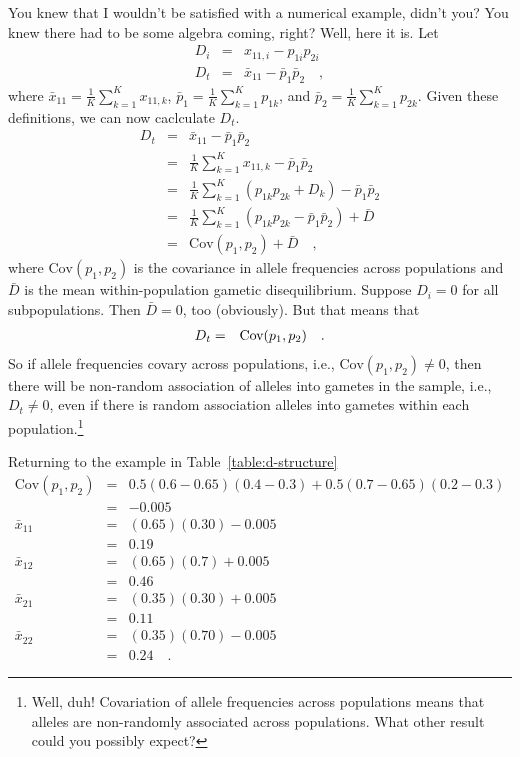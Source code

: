 \documentclass[12pt]{article}
\begin{document}
You knew that I wouldn't be satisfied with a numerical example, didn't
you? You knew there had to be some algebra coming, right? Well, here
it is. Let
\begin{eqnarray*}
D_i &=& x_{11,i} - p_{1i}p_{2i} \\
D_t &=& \bar x_{11} - \bar p_1\bar p_2 \quad ,
\end{eqnarray*}
where $\bar x_{11} = \frac{1}{K} \sum_{k=1}^K x_{11,k}$, $\bar p_1 =
\frac{1}{K} \sum_{k=1}^K p_{1k}$, and $\bar p_2 = \frac{1}{K}
\sum_{k=1}^K p_{2k}$. Given these definitions, we can now caclculate
$D_t$. 
\begin{eqnarray*}
D_t &=& \bar x_{11} - \bar p_1\bar p_2 \\
    &=& \frac{1}{K} \sum_{k=1}^K x_{11,k} - \bar p_1\bar p_2 \\
    &=& \frac{1}{K} \sum_{k=1}^K (p_{1k}p_{2k} + D_k) - \bar p_1\bar p_2 \\
    &=& \frac{1}{K} \sum_{k=1}^K (p_{1k}p_{2k} - \bar p_1\bar p_2) + \bar D \\
    &=& \mbox{Cov}(p_1, p_2) + \bar D \quad ,
\end{eqnarray*}
where $\mbox{Cov}(p_1, p_2)$ is the covariance in allele frequencies
across populations and $\bar D$ is the mean within-population gametic
disequilibrium. Suppose $D_i = 0$ for all subpopulations. Then $\bar D
= 0$, too (obviously). But that means that
\begin{eqnarray*}
D_t &=& \hbox{Cov}(p_1, p_2) \quad .
\end{eqnarray*}
So if allele frequencies covary across populations, i.e.,
$\mbox{Cov}(p_1, p_2) \ne 0$, then there will be non-random
association of alleles into gametes in the sample, i.e., $D_t \ne 0$,
even if there is random association alleles into gametes within each
population.\footnote{Well, duh! Covariation of allele frequencies
  across populations means that alleles are non-randomly associated
  across populations. What other result could you possibly expect?}

Returning to the example in Table~\ref{table:d-structure}
\begin{eqnarray*}
\mbox{Cov}(p_1, p_2) &=& 0.5(0.6-0.65)(0.4-0.3) + 0.5(0.7-0.65)(0.2-0.3) \\
                     &=& -0.005 \\
\bar x_{11}          &=& (0.65)(0.30) - 0.005 \\
                     &=& 0.19 \\
\bar x_{12}          &=& (0.65)(0.7) + 0.005 \\
                     &=& 0.46 \\
\bar x_{21}          &=& (0.35)(0.30) + 0.005 \\
                     &=& 0.11 \\
\bar x_{22}          &=& (0.35)(0.70) - 0.005 \\
                     &=& 0.24 \quad .
\end{eqnarray*}
\end{document}
